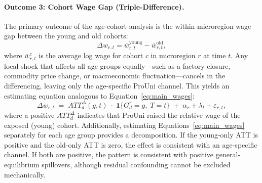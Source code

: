 \paragraph{Outcome 3: Cohort Wage Gap (Triple-Difference).}
The primary outcome of the age-cohort analysis is the within-microregion wage gap between the young and old cohorts:
\begin{equation}
    \Delta w_{r,t} = \bar{w}_{r,t}^{\text{young}} - \bar{w}_{r,t}^{\text{old}},
    \label{eq:wage_gap}
\end{equation}
where $\bar{w}_{r,t}^{c}$ is the average log wage for cohort $c$ in microregion $r$ at time $t$. Any local shock that affects all age groups equally---such as a factory closure, commodity price change, or macroeconomic fluctuation---cancels in the differencing, leaving only the age-specific ProUni channel. This yields an estimating equation analogous to Equation~\ref{eq:main_wages}:
\begin{equation}
    \Delta w_{r,t}
    \;=\;
    ATT_d^{\Delta}(g, t)
    \;\cdot\;
    \mathbf{1}\{G_d^r = g,\; T = t\}
    \;+\;
    \alpha_r + \lambda_t + \varepsilon_{r,t},
    \label{eq:main_gap}
\end{equation}
where a positive $ATT_d^{\Delta}$ indicates that ProUni raised the relative wage of the exposed (young) cohort. Additionally, estimating Equations~\ref{eq:main_wages} separately for each age group provides a decomposition. If the young-only ATT is positive and the old-only ATT is zero, the effect is consistent with an age-specific channel. If both are positive, the pattern is consistent with positive general-equilibrium spillovers, although residual confounding cannot be excluded mechanically.


